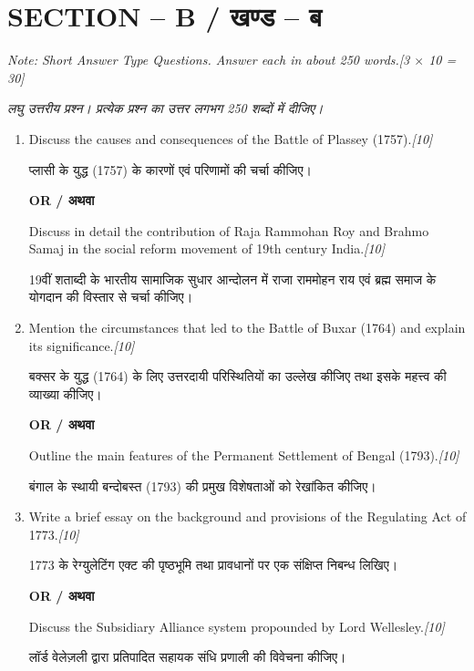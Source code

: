 \documentclass[11pt,a4paper]{article}
\newcommand{\pts}[1]{\hfill \textit{[#1]}}
\begin{document}
\bigskip

\section*{SECTION -- B / खण्ड -- ब}
\noindent \textit{Note: Short Answer Type Questions. Answer each in about 250 words.}\pts{3 $\times$ 10 = 30}

\noindent \textit{लघु उत्तरीय प्रश्न। प्रत्येक प्रश्न का उत्तर लगभग 250 शब्दों में दीजिए।}

\begin{enumerate}[label=\textbf{\arabic*.},leftmargin=*,start=2,itemsep=12pt]

  \item Discuss the causes and consequences of the Battle of Plassey (1757).\pts{10}
  
  प्लासी के युद्ध (1757) के कारणों एवं परिणामों की चर्चा कीजिए।

  \begin{center}\textbf{OR / अथवा}\end{center}

  Discuss in detail the contribution of Raja Rammohan Roy and Brahmo Samaj in the social reform movement of 19th century India.\pts{10}
  
  19वीं शताब्दी के भारतीय सामाजिक सुधार आन्दोलन में राजा राममोहन राय एवं ब्रह्म समाज के योगदान की विस्तार से चर्चा कीजिए।

  \item Mention the circumstances that led to the Battle of Buxar (1764) and explain its significance.\pts{10}
  
  बक्सर के युद्ध (1764) के लिए उत्तरदायी परिस्थितियों का उल्लेख कीजिए तथा इसके महत्त्व की व्याख्या कीजिए।

  \begin{center}\textbf{OR / अथवा}\end{center}

  Outline the main features of the Permanent Settlement of Bengal (1793).\pts{10}
  
  बंगाल के स्थायी बन्दोबस्त (1793) की प्रमुख विशेषताओं को रेखांकित कीजिए।

  \item Write a brief essay on the background and provisions of the Regulating Act of 1773.\pts{10}
  
  1773 के रेग्युलेटिंग एक्ट की पृष्ठभूमि तथा प्रावधानों पर एक संक्षिप्त निबन्ध लिखिए।

  \begin{center}\textbf{OR / अथवा}\end{center}

  Discuss the Subsidiary Alliance system propounded by Lord Wellesley.\pts{10}
  
  लॉर्ड वेलेज़ली द्वारा प्रतिपादित सहायक संधि प्रणाली की विवेचना कीजिए।

\end{enumerate}
\end{document}
